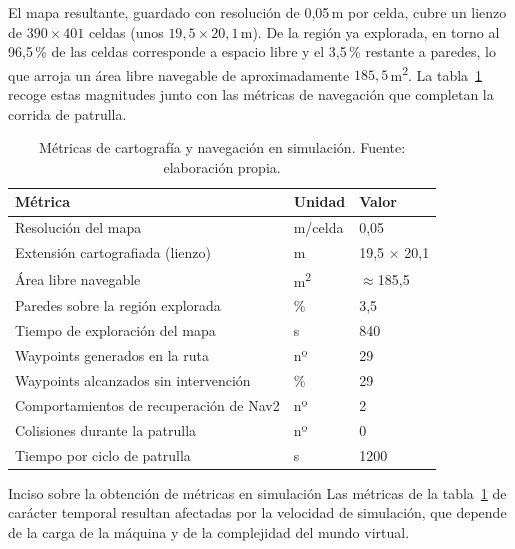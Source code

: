 El mapa resultante, guardado con resolución de 0,05\,m por celda, cubre un lienzo de
$390\times401$ celdas (unos $19{,}5\times20{,}1$\,m). De la región ya explorada, en torno al
96{,}5\,\% de las celdas corresponde a espacio libre y el 3{,}5\,\% restante a paredes, lo
que arroja un área libre navegable de aproximadamente $185{,}5$\,m\textsuperscript{2}. La
tabla~\ref{tab:metricas-navegacion} recoge estas magnitudes junto con las métricas de
navegación que completan la corrida de patrulla.

\begin{table}[htbp]
  \centering
  \small
  \caption{Métricas de cartografía y navegación en simulación. Fuente: elaboración propia.}
  \label{tab:metricas-navegacion}
  \begin{tabular}{@{}>{\raggedright\arraybackslash}p{7.5cm} l l@{}}
    \toprule
    \textbf{Métrica} & \textbf{Unidad} & \textbf{Valor} \\
    \midrule
    Resolución del mapa                      & m/celda & 0,05 \\
    Extensión cartografiada (lienzo)         & m       & 19,5 $\times$ 20,1 \\
    Área libre navegable                     & m\textsuperscript{2} & $\approx$185,5 \\
    Paredes sobre la región explorada        & \%      & 3,5 \\
    Tiempo de exploración del mapa           & s       & 840 \\
    Waypoints generados en la ruta           & nº      & 29  \\
    Waypoints alcanzados sin intervención    & \%      & 29  \\
    Comportamientos de recuperación de Nav2  & nº      & 2   \\
    Colisiones durante la patrulla           & nº      & 0   \\
    Tiempo por ciclo de patrulla             & s       & 1200\\
    \bottomrule
  \end{tabular}
\end{table}

\begin{notebox}{Inciso sobre la obtención de métricas en simulación}
  Las métricas de la tabla~\ref{tab:metricas-navegacion} de carácter temporal resultan afectadas por 
la velocidad de simulación, que depende de la carga de la máquina y de la complejidad del
mundo virtual.
\end{notebox}

